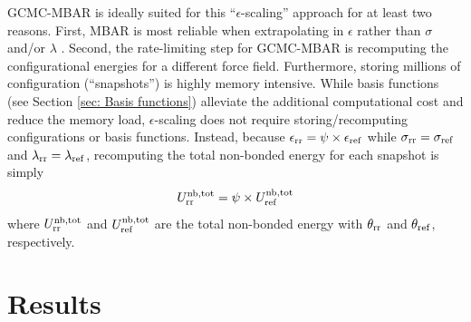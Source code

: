 \documentclass[journal=jced,manuscript=article]{achemso}
\begin{document}


GCMC-MBAR is ideally suited for this ``$\epsilon$-scaling'' approach for at least two reasons. First, MBAR is most reliable when extrapolating in $\epsilon$ rather than $\sigma$ and/or $\lambda$ \cite{Postdoc_1}. Second, the rate-limiting step for GCMC-MBAR is recomputing the configurational energies for a different force field. Furthermore, storing millions of configuration (``snapshots'') is highly memory intensive. While basis functions (see Section \ref{sec: Basis functions}) alleviate the additional computational cost and reduce the memory load, $\epsilon$-scaling does not require storing/recomputing configurations or basis functions. Instead, because $\epsilon_{\rm rr} = \psi \times \epsilon_{\rm ref}$ while $\sigma_{\rm rr} = \sigma_{\rm ref}$ and $\lambda_{\rm rr} = \lambda_{\rm ref}$, recomputing the total non-bonded energy for each snapshot is simply 
\begin{equation}
U^{\rm nb, tot}_{\rm rr} = \psi \times U^{\rm nb, tot}_{\rm ref}
\end{equation}
where $U^{\rm nb, tot}_{\rm rr}$ and $U^{\rm nb, tot}_{\rm ref}$ are the total non-bonded energy with $\theta_{\rm rr}$ and $\theta_{\rm ref}$, respectively.


\section{Results} \label{sec: Results}
\end{document}
